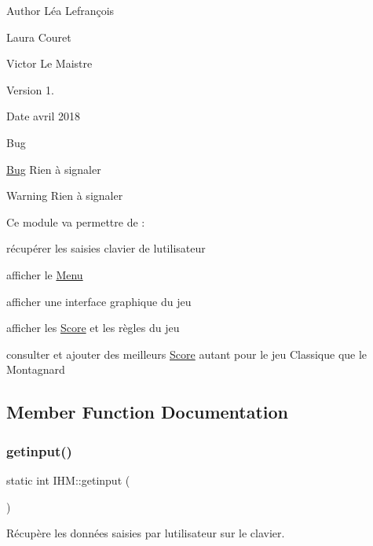 \begin{DoxyAuthor}{Author}
Léa Lefrançois 

Laura Couret 

Victor Le Maistre 
\end{DoxyAuthor}
\begin{DoxyVersion}{Version}
1. 
\end{DoxyVersion}
\begin{DoxyDate}{Date}
avril 2018 
\end{DoxyDate}
\begin{DoxyRefDesc}{Bug}
\item[\hyperlink{bug__bug000003}{Bug}]Rien à signaler \end{DoxyRefDesc}
\begin{DoxyWarning}{Warning}
Rien à signaler
\end{DoxyWarning}
Ce module va permettre de \+:
\begin{DoxyItemize}
\item récupérer les saisies clavier de l\textquotesingle{}utilisateur
\item afficher le \hyperlink{classMenu}{Menu}
\item afficher une interface graphique du jeu
\item afficher les \hyperlink{classScore}{Score} et les règles du jeu
\item consulter et ajouter des meilleurs \hyperlink{classScore}{Score} autant pour le jeu Classique que le Montagnard 
\end{DoxyItemize}

\subsection{Member Function Documentation}
\mbox{\label{classIHM_a87654cde450f04cacddaf7a781f5300c}} 
\subsubsection{\texorpdfstring{getinput()}{getinput()}}
{\footnotesize\ttfamily static int I\+H\+M\+::getinput (\begin{DoxyParamCaption}{ }\end{DoxyParamCaption})\hspace{0.3cm}{\ttfamily [static]}}



Récupère les données saisies par l\textquotesingle{}utilisateur sur le clavier. 

